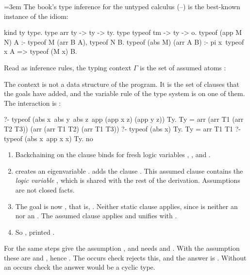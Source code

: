 {{{\emergencystretch=3em
The book's type inference for the untyped calculus (--) is the best-known
instance of the idiom:\par}
\begin{lprolog}
kind ty type.
type arr     ty -> ty -> ty.
type typeof  tm -> ty -> o.
typeof (app M N) A :- typeof M (arr B A), typeof N B.
typeof (abs M) (arr A B) :- pi x\ typeof x A => typeof (M x) B.
\end{lprolog}
Read as inference rules, the typing context $\Gamma$ is the set of assumed atoms :
The context is not a data structure of the program. It is the set of clauses that the \lp{=>} goals have added,
and the variable rule of the type system is  on one of them. The interaction is
:
\begin{lprolog}
?- typeof (abs x\ abs y\ abs z\ app (app x z) (app y z)) Ty.
Ty = arr (arr T1 (arr T2 T3)) (arr (arr T1 T2) (arr T1 T3))
?- typeof (abs x\x) Ty.
Ty = arr T1 T1
?- typeof (abs x\ app x x) Ty.
no
\end{lprolog}

\begin{tutorial}
\begin{enumerate}[nosep]
  \item Backchaining on the  clause binds  for fresh logic variables , , and
        .
  \item {} creates an eigenvariable .  adds the clause .
        This assumed clause contains the \emph{logic variable} , which is shared with the rest of the
        derivation. Assumptions are not closed facts.
  \item The goal is now , that is, . Neither static clause applies, since
         is neither an  nor an . The assumed clause applies and unifies  with .
  \item So , printed .
\end{enumerate}
For  the same steps give the assumption , and  needs
 and . With the assumption these are  and ,
hence . The occurs check rejects this, and the answer is . Without an occurs check the
answer would be a cyclic type.
\end{tutorial}

}}
